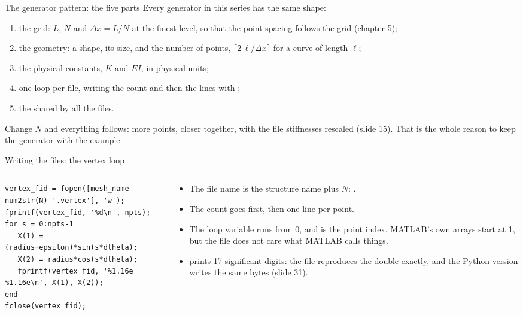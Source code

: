 \documentclass[aspectratio=169,11pt]{beamer}
\begin{document}
\begin{frame}{The generator pattern: the five parts}
\small Every generator in this series has the same shape:
\begin{enumerate}
  \item the grid: $L$, $N$ and $\Delta x = L/N$ at the finest level, so that the point spacing follows the grid (chapter 5);
  \item the geometry: a shape, its size, and the number of points, $\lceil 2\,\ell/\Delta x\rceil$ for a curve of length $\ell$;
  \item the physical constants, $K$ and $EI$, in physical units;
  \item one loop per file, writing the count and then the lines with ;
  \item the  shared by all the files.
\end{enumerate}
\vspace{2mm}
\begin{punchbox}
\small Change $N$ and everything follows: more points, closer together, with the file stiffnesses rescaled (slide 15). That is the whole reason to keep the generator with the example.
\end{punchbox}
\end{frame}

\begin{frame}[fragile]{Writing the files: the vertex loop}
\begin{columns}[T,onlytextwidth]
\begin{column}{0.52\textwidth}
\begin{lstlisting}[style=matlab,basicstyle=\ttfamily\tiny\color{BlackGray}]
% Write out the vertex information
vertex_fid = fopen([mesh_name num2str(N) '.vertex'], 'w');
fprintf(vertex_fid, '%d\n', npts);
for s = 0:npts-1
   X(1) = (radius+epsilon)*sin(s*dtheta);
   X(2) = radius*cos(s*dtheta);
   fprintf(vertex_fid, '%1.16e %1.16e\n', X(1), X(2));
end
fclose(vertex_fid);
\end{lstlisting}
\end{column}
\begin{column}{0.46\textwidth}
\small
\begin{itemize}
  \item The file name is the structure name plus $N$: .
  \item The count goes first, then one line per point.
  \item The loop variable  runs from 0, and is the point index. MATLAB's own arrays start at 1, but the file does not care what MATLAB calls things.
  \item {} prints 17 significant digits: the file reproduces the double exactly, and the Python version writes the same bytes (slide 31).
\end{itemize}
\end{column}
\end{columns}
\end{frame}
\end{document}
